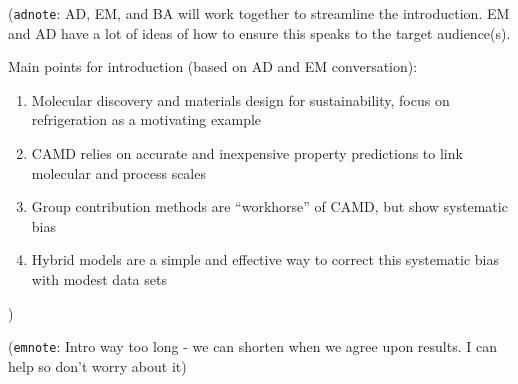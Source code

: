 \documentclass[journal=jacsat,manuscript=article]{achemso}
\newcommand{\adnote}[1]{{\color{OliveGreen} (\texttt{adnote}: #1)}}
\newcommand{\emnote}[1]{{\color{SeaGreen} (\texttt{emnote}: #1)}}
\begin{document}
\adnote{AD, EM, and BA will work together to streamline the introduction. EM and AD have a lot of ideas of how to ensure this speaks to the target audience(s).

Main points for introduction (based on AD and EM conversation):
\begin{enumerate}
    \item Molecular discovery and materials design for sustainability, focus on refrigeration as a motivating example
    \item CAMD relies on accurate and inexpensive property predictions to link molecular and process scales
    \item Group contribution methods are ``workhorse'' of CAMD, but show systematic bias
    \item Hybrid models are a simple and effective way to correct this systematic bias with modest data sets
\end{enumerate}

}
\emnote{Intro way too long - we can shorten when we agree upon results. I can help so don't worry about it}
\end{document}
